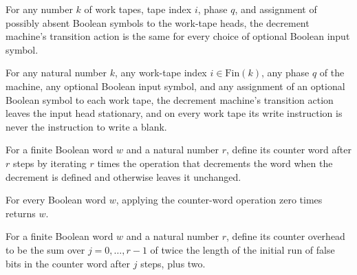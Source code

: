 \begin{theorem}
\label{Turing.decrementTM_tr_input}
\leanok
{}
For any number $k$ of work tapes, tape index $i$, phase $q$, and assignment of possibly
absent Boolean symbols to the work-tape heads, the decrement machine's transition action
is the same for every choice of optional Boolean input symbol.
\end{theorem}

\begin{theorem}
\label{Turing.decrementTM_tr_action}
\leanok
{}
For any natural number $k$, any work-tape index $i\in\mathrm{Fin}(k)$, any phase $q$ of the machine,
any optional Boolean input symbol, and any assignment of an optional Boolean symbol to
each work tape, the decrement machine's transition action leaves the input head
stationary, and on every work tape its write instruction is never the instruction to
write a blank.
\end{theorem}

\begin{definition}
\label{Turing.counterWord}
\leanok
{}
For a finite Boolean word $w$ and a natural number $r$, define its counter word after
$r$ steps by iterating $r$ times the operation that decrements the word when the
decrement is defined and otherwise leaves it unchanged.
\end{definition}

\begin{theorem}
\label{Turing.counterWord_zero}
\leanok
{}
For every Boolean word $w$, applying the counter-word operation zero times returns $w$.
\end{theorem}

\begin{definition}
\label{Turing.counterOverhead}
\leanok
{}
For a finite Boolean word $w$ and a natural number $r$, define its counter overhead to
be the sum over $j=0,\ldots,r-1$ of twice the length of the initial run of false
bits in the counter word after $j$ steps, plus two.
\end{definition}

